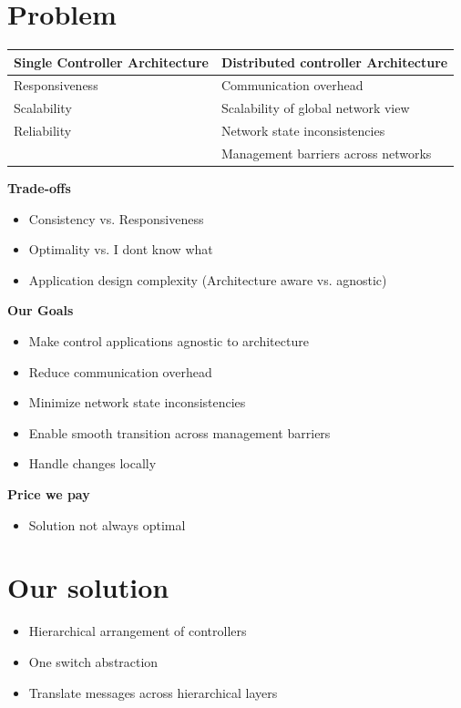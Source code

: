 \documentclass[a0,portrait]{a0poster}
\begin{document}
\begin{multicols}{2}
\color{DarkSlateGray} %

\section*{Problem}

\begin{tabular} {l | l}
    \textbf{Single Controller Architecture} & \textbf{Distributed controller Architecture} \\
    \hline
    Responsiveness & Communication overhead \\
       Scalability & Scalability of global network view \\
       Reliability & Network state inconsistencies \\
                   & Management barriers across networks
\end{tabular}

\textbf{Trade-offs}
\begin{itemize}
    \item Consistency vs. Responsiveness
    \item Optimality vs. I dont know what
    \item Application design complexity (Architecture aware vs. agnostic)
\end{itemize}

\textbf{Our Goals}
\begin{itemize}
    \item Make control applications agnostic to architecture
    \item Reduce communication overhead
    \item Minimize network state inconsistencies
    \item Enable smooth transition across management barriers
    \item Handle changes locally
\end{itemize}

\textbf{Price we pay}
\begin{itemize}
    \item Solution not always optimal
\end{itemize}

\section*{Our solution}
\begin{itemize}
    \item Hierarchical arrangement of controllers
    \item One switch abstraction
    \item Translate messages across hierarchical layers
\end{itemize}


\end{multicols}
\end{document}
